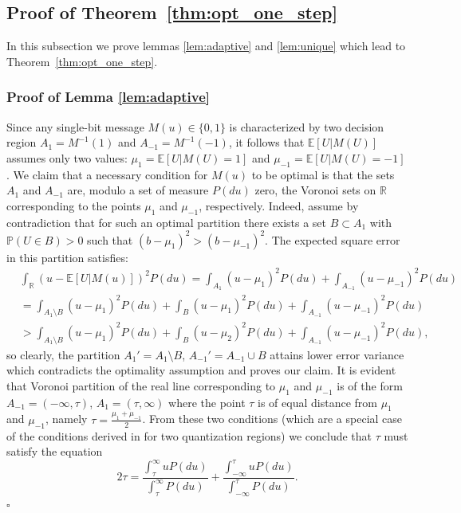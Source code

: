 \documentclass[letterpaper, conference]{IEEEtran}      %
\newcommand*{\QEDA}{\hfill\ensuremath{\square}}
\begin{document}
\subsection*{Proof of Theorem~\ref{thm:opt_one_step}}
In this subsection we prove lemmas \ref{lem:adaptive} and \ref{lem:unique} which lead to Theorem~\ref{thm:opt_one_step}. 

\subsubsection*{Proof of Lemma \ref{lem:adaptive}}
Since any single-bit message $M(u) \in \{0,1\}$ is characterized by two decision region $A_1 = M^{-1}(1)$ and $A_{-1} = M^{-1}(-1)$, it follows that $\mathbb E \left[ U | M(U) \right]$ assumes only two values: $\mu_1 = \mathbb E \left[ U | M(U) = 1 \right]$ and $\mu_{-1} = \mathbb E \left[ U | M(U) = -1 \right]$. We claim that a necessary condition for $M(u)$ to be optimal is that the sets $A_1$ and $A_{-1}$ are, modulo a set of measure $P(du)$ zero, the Voronoi sets on $\mathbb R$ corresponding to the points $\mu_1$ and $\mu_{-1}$, respectively. Indeed, assume by contradiction that for such an optimal partition there exists a set $B \subset A_{1}$ with $\mathbb P (U \in B) >0$ such that $\left( b-\mu_{1} \right)^2 > \left( b- \mu_{-1} \right)^2$. The expected square error in this partition satisfies:
\begin{align*}
& \int_{\mathbb R} \left( u - \mathbb E[U|M(u)]  \right)^2 P(du) = \int_{A_1} (u- \mu_1)^2 P(du) + \int_{A_{-1}} (u- \mu_{-1})^2 P(du) \\
& = \int_{A_1\setminus B} (u- \mu_1)^2 P(du) +  \int_{B} (u- \mu_1)^2 P(du) + \int_{A_{-1}} (u- \mu_{-1})^2 P(du) \\
& > \int_{A_1\setminus B} (u- \mu_1)^2 P(du) +  \int_{B} (u- \mu_2)^2 P(du) + \int_{A_{-1}} (u- \mu_{-1})^2 P(du),
\end{align*}
so clearly, the partition $A_1' = A_1 \setminus B$, $A_{-1}' = A_{-1} \cup B$ attains lower error variance which contradicts the optimality assumption and proves our claim. It is evident that Voronoi partition of the real line corresponding to $\mu_1$ and $\mu_{-1}$ is of the form $A_{-1} = (-\infty,\tau)$, $A_{1} = (\tau, \infty)$ where the point $\tau$ is of equal distance from $\mu_1$ and $\mu_{-1}$, namely $\tau = \frac{\mu_1 + \mu_{-1}}{2}$. From these two conditions (which are a special case of the conditions derived in \cite{1056489} for two quantization regions) we conclude that $\tau$ must satisfy the equation
\[
2 \tau = \frac{\int_{\tau}^\infty u P(du)}{\int_{\tau}^\infty P(du)} + \frac{\int_{-\infty}^{\tau} u P(du)}{\int_{-\infty}^{\tau} P(du)}.
\] 
\QEDA
\end{document}
